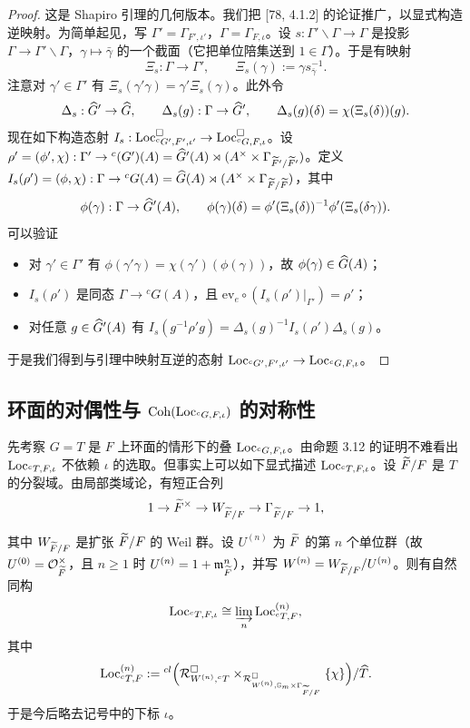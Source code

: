 \begin{proof}
这是 Shapiro 引理的几何版本。我们把 [78, 4.1.2] 的论证推广，以显式构造逆映射。为简单起见，写 $\Gamma'=\Gamma_{F',\iota'}$，$\Gamma=\Gamma_{F,\iota}$。设 $s:\Gamma'\backslash\Gamma\to\Gamma$ 是投影 $\Gamma\to\Gamma'\backslash\Gamma$，$\gamma\mapsto\bar\gamma$ 的一个截面（它把单位陪集送到 $1\in\Gamma$）。于是有映射
\[
\Xi_s:\Gamma\to\Gamma',\qquad \Xi_s(\gamma):=\gamma s_{\bar\gamma}^{-1}.
\]
注意对 $\gamma'\in\Gamma'$ 有 $\Xi_s(\gamma'\gamma)=\gamma'\Xi_s(\gamma)$。此外令
\[
\Delta_s:\widehat{G}'\to\widehat{G},\qquad \Delta_s(g):\Gamma\to\widehat{G}',\qquad \Delta_s(g)(\delta)=\chi(\Xi_s(\delta))(g).
\]
现在如下构造态射 $I_s:\operatorname{Loc}^{\square}_{{}^cG',F',\iota'}\to\operatorname{Loc}^{\square}_{{}^cG,F,\iota}$。设 $\rho'=(\phi',\chi):\Gamma'\to{}^c(G')(A)=\widehat{G}'(A)\rtimes(A^\times\times\Gamma_{\widetilde F'/\widetilde F'})$。定义 $I_s(\rho')=(\phi,\chi):\Gamma\to{}^cG(A)=\widehat{G}(A)\rtimes(A^\times\times\Gamma_{\widetilde F/\widetilde F})$，其中
\[
\phi(\gamma):\Gamma\to\widehat{G}'(A),\qquad \phi(\gamma)(\delta)=\phi'(\Xi_s(\delta))^{-1}\phi'(\Xi_s(\delta\gamma)).
\]
可以验证
\begin{itemize}[leftmargin=1.6em,itemsep=0.2em]
\item 对 $\gamma'\in\Gamma'$ 有 $\phi(\gamma'\gamma)=\chi(\gamma')(\phi(\gamma))$，故 $\phi(\gamma)\in\widehat{G}(A)$；
\item $I_s(\rho')$ 是同态 $\Gamma\to{}^cG(A)$，且 $\mathrm{ev}_e\circ(I_s(\rho')|_{\Gamma'})=\rho'$；
\item 对任意 $g\in\widehat{G}'(A)$ 有 $I_s(g^{-1}\rho'g)=\Delta_s(g)^{-1}I_s(\rho')\Delta_s(g)$。
\end{itemize}
于是我们得到与引理中映射互逆的态射 $\operatorname{Loc}_{{}^cG',F',\iota'}\to\operatorname{Loc}_{{}^cG,F,\iota}$。
\end{proof}

\subsection{环面的对偶性与 $\operatorname{Coh}(\operatorname{Loc}_{{}^cG,F,\iota})$ 的对称性}

先考察 $G=T$ 是 $F$ 上环面的情形下的叠 $\operatorname{Loc}_{{}^cG,F,\iota}$。由命题 3.12 的证明不难看出 $\operatorname{Loc}_{{}^cT,F,\iota}$ 不依赖 $\iota$ 的选取。但事实上可以如下显式描述 $\operatorname{Loc}_{{}^cT,F,\iota}$。设 $\widetilde F/F$ 是 $T$ 的分裂域。由局部类域论，有短正合列
\[
1\to\widetilde F^\times\to W_{\widetilde F/F}\to\Gamma_{\widetilde F/F}\to1,
\]

其中 $W_{\widetilde F/F}$ 是扩张 $\widetilde F/F$ 的 Weil 群。设 $U^{(n)}$ 为 $\widetilde F$ 的第 $n$ 个单位群（故 $U^{(0)}=\mathcal O_{\widetilde F}^\times$，且 $n\geq1$ 时 $U^{(n)}=1+\mathfrak m_{\widetilde F}^n$），并写 $W^{(n)}=W_{\widetilde F/F}/U^{(n)}$。则有自然同构
\[
\operatorname{Loc}_{{}^cT,F,\iota}\cong\varinjlim_n \operatorname{Loc}^{(n)}_{{}^cT,F},
\]
其中
\[
\operatorname{Loc}^{(n)}_{{}^cT,F}:={}^{cl}\Big(\mathcal R^{\square}_{W^{(n)},{}^cT}\times_{\mathcal R^{\square}_{W^{(n)},\mathbb G_m\times\Gamma_{\widetilde F/F}}}\{\chi\}\Big)/\widehat{T}.
\]
于是今后略去记号中的下标 $\iota$。


